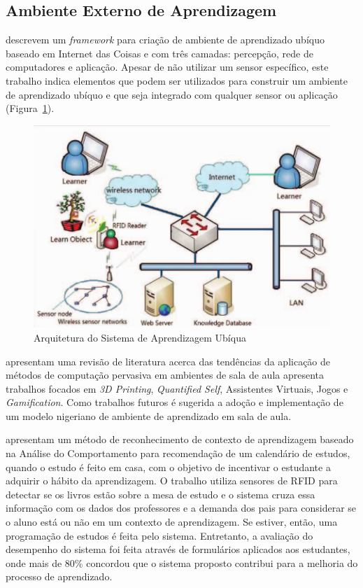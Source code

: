 
\subsection{Ambiente Externo de Aprendizagem}
\label{section:OutdoorClassroom}

\cite{Xue:2011} descrevem um \textit{framework} para criação de ambiente de aprendizado ubíquo baseado em Internet das Coisas e com três camadas: percepção, rede de computadores e aplicação. Apesar de não utilizar um sensor específico, este trabalho indica elementos que podem ser utilizados para construir um ambiente de aprendizado ubíquo e que seja integrado com qualquer sensor ou aplicação (Figura~\ref{fig:Xue2011}).

\begin{figure}[ht]
	\centering
	\includegraphics[width=0.9\linewidth]{imgs/Xue2011}
	\caption{Arquitetura do Sistema de Aprendizagem Ubíqua}
	\label{fig:Xue2011}
\end{figure}

\cite{Oluwagbemi:2014} apresentam uma revisão de literatura acerca das tendências da aplicação de métodos de computação pervasiva em ambientes de sala de aula apresenta trabalhos focados em \textit{3D Printing}, \textit{Quantified Self}, Assistentes Virtuais, Jogos e \textit{Gamification}. Como trabalhos futuros é sugerida a adoção e implementação de um modelo nigeriano de ambiente de aprendizado em sala de aula.

\cite{Dong:2007} apresentam um método de reconhecimento de contexto de aprendizagem baseado na Análise do Comportamento para recomendação de um calendário de estudos, quando o estudo é feito em casa, com o objetivo de incentivar o estudante a adquirir o hábito da aprendizagem. O trabalho utiliza sensores de RFID para detectar se os livros estão sobre a mesa de estudo e o sistema cruza essa informação com os dados dos professores e a demanda dos pais para considerar se o aluno está ou não em um contexto de aprendizagem. Se estiver, então, uma programação de estudos é feita pelo sistema. Entretanto, a avaliação do desempenho do sistema foi feita através de formulários aplicados aos estudantes, onde mais de 80\% concordou que o sistema proposto contribui para a melhoria do processo de aprendizado.

